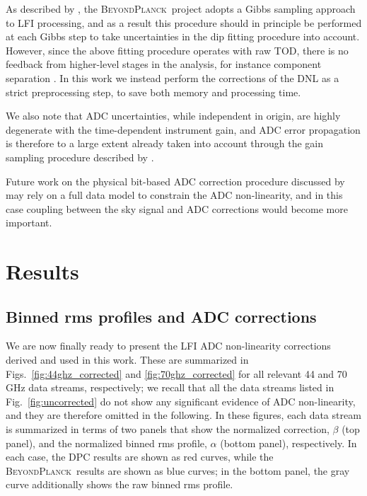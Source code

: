\documentclass[twocolumn]{aa}
\newcommand{\BP}{\textsc{BeyondPlanck}}
\begin{document}
As described by \citet{bp01}, the \BP\ project adopts a Gibbs sampling approach to LFI processing, and as a result this procedure should in principle be performed at each Gibbs step to take uncertainties in the dip fitting procedure into account. However, since the above fitting procedure operates with raw TOD, there is no feedback from higher-level stages in the analysis, for instance component separation \citep{bp13}. In this work we instead perform the corrections of the DNL as a strict preprocessing step, to save both memory and processing time. 

We also note that ADC uncertainties, while independent in origin, are highly degenerate with the time-dependent instrument gain, and ADC error propagation is therefore to a large extent already taken into account through the gain sampling procedure described by \citet{bp07}. 

Future work on the physical bit-based ADC correction procedure discussed by \citet{planck2016-l02} may rely on a full data model to constrain the ADC non-linearity, and in this case coupling between the sky signal and ADC corrections would become more important.


\section{Results}\label{sec:results}


\subsection{Binned rms profiles and ADC corrections}\label{sub:binnedrms}

We are now finally ready to present the LFI ADC non-linearity corrections derived and used in this work. These are summarized in Figs.~\ref{fig:44ghz_corrected} and \ref{fig:70ghz_corrected} for all relevant 44 and 70\,GHz data streams, respectively; we recall that all the data streams listed in Fig.~\ref{fig:uncorrected} do not show any significant evidence of ADC non-linearity, and they are therefore omitted in the following. In these figures, each data stream is summarized in terms of two panels that show the normalized correction, $\beta$ (top panel), and the normalized binned rms profile, $\alpha$ (bottom panel), respectively. In each case, the DPC results are shown as red curves, while the \BP\ results are shown as blue curves; in the bottom panel, the gray curve additionally shows the raw binned rms profile. 
\end{document}
